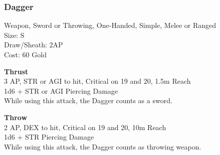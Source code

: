 \subsubsection{Dagger}\label{weapon:dagger}
Weapon, Sword or Throwing, One-Handed, Simple, Melee or Ranged\\
Size: S\\
Draw/Sheath: 2AP\\
Cost: 60 Gold

\textbf{Thrust} \\
3 AP, STR or AGI to hit, Critical on 19 and 20, 1.5m Reach\\
1d6 + \texttimes STR or AGI Piercing Damage\\
While using this attack, the Dagger counts as a sword.

\textbf{Throw} \\
2 AP, DEX to hit, Critical on 19 and 20, 10m Reach\\
1d6 + \texttimes STR Piercing Damage\\
While using this attack, the Dagger counts as throwing weapon.

